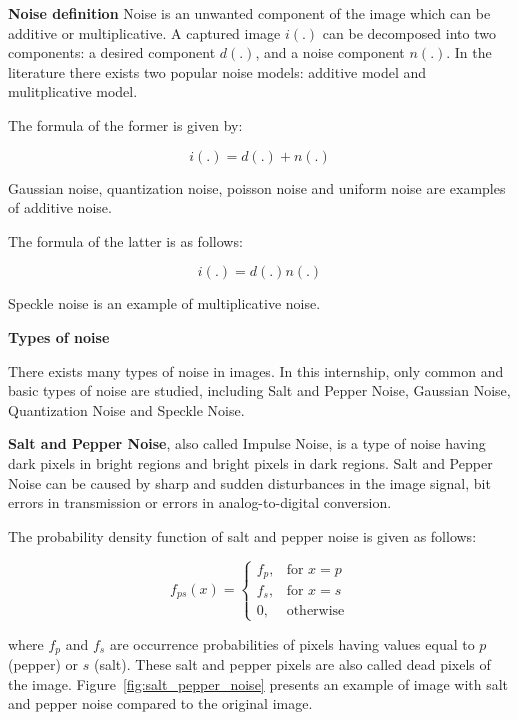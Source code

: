 \textbf{Noise definition}
Noise is an unwanted component of the image which can be additive or multiplicative. A captured image $i(.)$ can be decomposed into two components: a desired component $d(.)$, and a noise component $n(.)$. In the literature there exists two popular noise models: additive model and mulitplicative model. 

The formula of the former is given by:

\begin{equation}
	i(.) = d(.) + n(.)
\end{equation}

Gaussian noise, quantization noise, poisson noise and uniform noise are examples of additive noise. 

The formula of the latter is as follows:

\begin{equation}
	i(.) = d(.)n(.)
\end{equation}

Speckle noise is an example of multiplicative noise. 

\textbf{Types of noise}

There exists many types of noise in images. In this internship, only common and basic types of noise are studied, including Salt and Pepper Noise, Gaussian Noise, Quantization Noise and Speckle Noise.

\textbf{Salt and Pepper Noise}, also called Impulse Noise, is a type of noise having dark pixels in bright regions and bright pixels in dark regions. Salt and Pepper Noise can be caused by sharp and sudden disturbances in the image signal, bit errors in transmission or errors in analog-to-digital conversion. 

The probability density function of salt and pepper noise is given as follows:

\begin{equation}
    f_{ps}(x)= 
\begin{cases}
    f_p, & \text{for } x = p\\
    f_s, & \text{for } x = s\\
    0,              & \text{otherwise}
\end{cases}
\end{equation}

where $f_p$ and $f_s$ are occurrence probabilities of pixels having values equal to $p$ (pepper) or $s$ (salt). These salt and pepper pixels are also called dead pixels of the image. Figure~\ref{fig:salt_pepper_noise} presents an example of image with salt and pepper noise compared to the original image.

